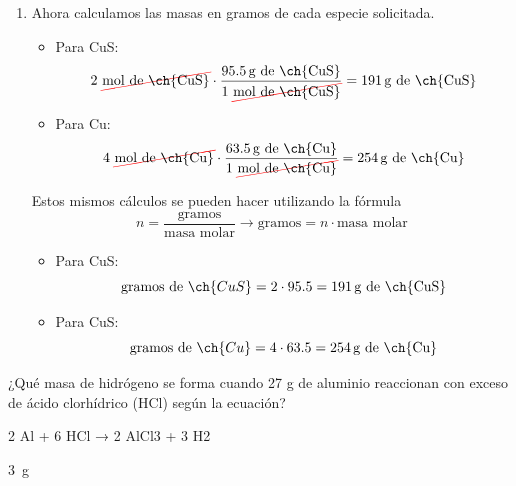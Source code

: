 \begin{example}
\begin{enumerate}[label=\numberballmDarkTeal]
\begin{itemize}
\begin{equation*}
                \end{equation*}
            \end{itemize}
            \item Ahora calculamos las masas en gramos de cada especie solicitada.
            \begin{itemize}
                \item Para CuS:
                \begin{equation*}
                    2\ \cancelred{\unit{\mol}\ \text{de \ch{CuS}}} \cdot \dfrac{\qty{95.5}{\g}\ \text{de \ch{CuS}}}{1\ \cancelred{\unit{\mole} \ \text{de \ch{CuS}}}} = \qty{191}{\g}\ \text{de \ch{CuS}}
                \end{equation*}
                \item Para Cu:
                \begin{equation*}
                    4\ \cancelred{\unit{\mol}\ \text{de \ch{Cu}}} \cdot \dfrac{\qty{63.5}{\g}\ \text{de \ch{Cu}}}{1\ \cancelred{\unit{\mole} \ \text{de \ch{Cu}}}} = \qty{254}{\g}\ \text{de \ch{Cu}}
                \end{equation*}
            \end{itemize}
            Estos mismos cálculos se pueden hacer utilizando la fórmula
            \begin{equation*}
                n = \dfrac{\text{gramos}}{\text{masa molar}} \longrightarrow \text{gramos} = n \cdot \text{masa molar}
            \end{equation*}
            \begin{itemize}
                \item Para CuS:
                \begin{equation*}
                    \text{gramos de } \ch{CuS} = 2\cdot 95.5 = \qty{191}{\g}\ \text{de \ch{CuS}}
                \end{equation*}
                \item Para CuS:
                \begin{equation*}
                    \text{gramos de } \ch{Cu} = 4\cdot 63.5 = \qty{254}{\g}\ \text{de \ch{Cu}}
                \end{equation*}
            \end{itemize}
    \end{enumerate}
\end{example}



\begin{exercise}
    ¿Qué masa de hidrógeno se forma cuando 27 g de aluminio reaccionan con exceso de ácido clorhídrico (HCl) según la ecuación?
    \begin{reaction*}
        2 Al + 6 HCl → 2 AlCl3 + 3 H2
    \end{reaction*}

    \begin{solu}
        \qty{3}{\g}
    \end{solu}
\end{exercise}

